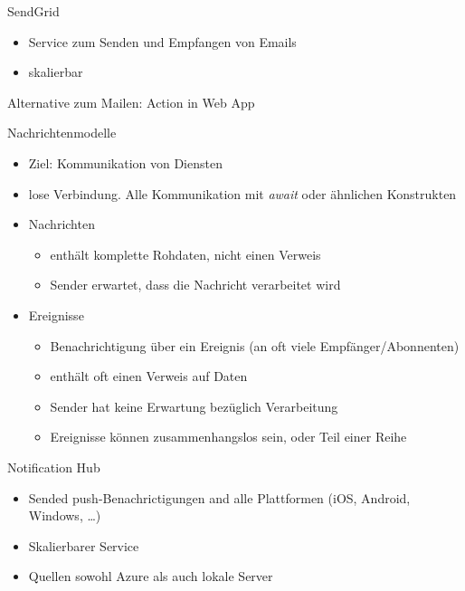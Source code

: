 
\begin{flashcard}[Definition]{SendGrid}
    \begin{itemize}
        \item Service zum Senden und Empfangen von Emails
        \item skalierbar
    \end{itemize}
    \vspace{1cm}
    Alternative zum Mailen: Action in Web App
\end{flashcard}

\begin{flashcard}[Definition]{Nachrichtenmodelle}
    \begin{itemize}
        \item Ziel: Kommunikation von Diensten
        \item lose Verbindung. Alle Kommunikation mit \emph{await} oder ähnlichen Konstrukten
        \item Nachrichten
            \begin{itemize}
                \item enthält komplette Rohdaten, nicht einen Verweis
                \item Sender erwartet, dass die Nachricht verarbeitet wird
            \end{itemize}
        \item Ereignisse
            \begin{itemize}
                \item Benachrichtigung über ein Ereignis (an oft viele Empfänger/Abonnenten)
                \item enthält oft einen Verweis auf Daten
                \item Sender hat keine Erwartung bezüglich Verarbeitung
                \item Ereignisse können zusammenhangslos sein, oder Teil einer Reihe
            \end{itemize}
    \end{itemize}
\end{flashcard}

\begin{flashcard}[Definition]{Notification Hub}
    \begin{itemize}
        \item Sended push-Benachrictigungen and alle Plattformen (iOS, Android, Windows, \ldots)
        \item Skalierbarer Service
        \item Quellen sowohl Azure als auch lokale Server
    \end{itemize}
\end{flashcard}

